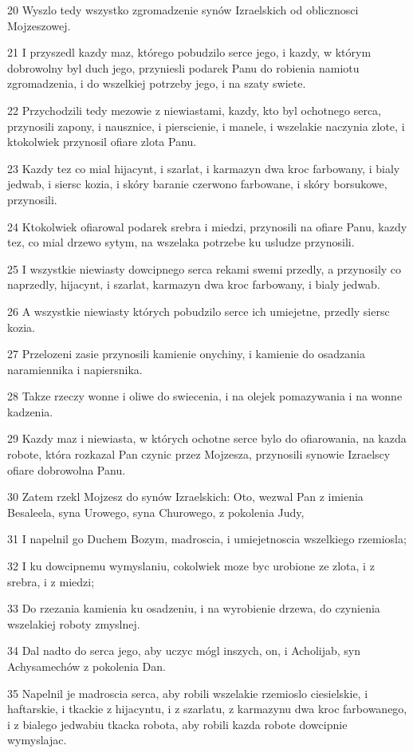 \par 20 Wyszlo tedy wszystko zgromadzenie synów Izraelskich od oblicznosci Mojzeszowej.
\par 21 I przyszedl kazdy maz, którego pobudzilo serce jego, i kazdy, w którym dobrowolny byl duch jego, przyniesli podarek Panu do robienia namiotu zgromadzenia, i do wszelkiej potrzeby jego, i na szaty swiete.
\par 22 Przychodzili tedy mezowie z niewiastami, kazdy, kto byl ochotnego serca, przynosili zapony, i nausznice, i pierscienie, i manele, i wszelakie naczynia zlote, i ktokolwiek przynosil ofiare zlota Panu.
\par 23 Kazdy tez co mial hijacynt, i szarlat, i karmazyn dwa kroc farbowany, i bialy jedwab, i siersc kozia, i skóry baranie czerwono farbowane, i skóry borsukowe, przynosili.
\par 24 Ktokolwiek ofiarowal podarek srebra i miedzi, przynosili na ofiare Panu, kazdy tez, co mial drzewo sytym, na wszelaka potrzebe ku usludze przynosili.
\par 25 I wszystkie niewiasty dowcipnego serca rekami swemi przedly, a przynosily co naprzedly, hijacynt, i szarlat, karmazyn dwa kroc farbowany, i bialy jedwab.
\par 26 A wszystkie niewiasty których pobudzilo serce ich umiejetne, przedly siersc kozia.
\par 27 Przelozeni zasie przynosili kamienie onychiny, i kamienie do osadzania naramiennika i napiersnika.
\par 28 Takze rzeczy wonne i oliwe do swiecenia, i na olejek pomazywania i na wonne kadzenia.
\par 29 Kazdy maz i niewiasta, w których ochotne serce bylo do ofiarowania, na kazda robote, która rozkazal Pan czynic przez Mojzesza, przynosili synowie Izraelscy ofiare dobrowolna Panu.
\par 30 Zatem rzekl Mojzesz do synów Izraelskich: Oto, wezwal Pan z imienia Besaleela, syna Urowego, syna Churowego, z pokolenia Judy,
\par 31 I napelnil go Duchem Bozym, madroscia, i umiejetnoscia wszelkiego rzemiosla;
\par 32 I ku dowcipnemu wymyslaniu, cokolwiek moze byc urobione ze zlota, i z srebra, i z miedzi;
\par 33 Do rzezania kamienia ku osadzeniu, i na wyrobienie drzewa, do czynienia wszelakiej roboty zmyslnej.
\par 34 Dal nadto do serca jego, aby uczyc mógl inszych, on, i Acholijab, syn Achysamechów z pokolenia Dan.
\par 35 Napelnil je madroscia serca, aby robili wszelakie rzemioslo ciesielskie, i haftarskie, i tkackie z hijacyntu, i z szarlatu, z karmazynu dwa kroc farbowanego, i z bialego jedwabiu tkacka robota, aby robili kazda robote dowcipnie wymyslajac.

